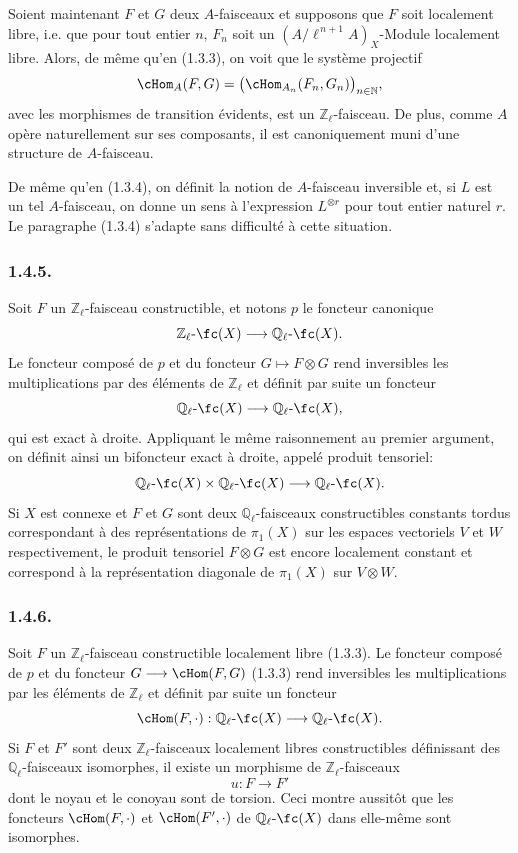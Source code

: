 Soient maintenant \(F\) et \(G\) deux \(A\)-faisceaux et supposons que \(F\) soit localement libre, i.e. que pour tout entier \(n\), \(F_n\) soit un \((A/\ell^{\,n+1}A)_X\)-Module localement libre. Alors, de même qu'en (1.3.3), on
voit que le système projectif
\[
\cHom_A(F,G)=\bigl(\cHom_{A_n}(F_n,G_n)\bigr)_{n\in\mathbb{N}},
\]
avec les morphismes de transition évidents, est un \(\mathbb{Z}_\ell\)-faisceau. De plus, comme \(A\) opère naturellement sur ses composants, il est canoniquement muni d'une structure de \(A\)-faisceau.

De même qu'en (1.3.4), on définit la notion de \(A\)-faisceau inversible et, si \(L\) est un tel \(A\)-faisceau, on donne un sens à l'expression \(L^{\otimes r}\) pour tout entier naturel \(r\). Le paragraphe (1.3.4) s'adapte sans difficulté à cette situation.

\subsubsection*{1.4.5.}
Soit \(F\) un \(\mathbb{Z}_\ell\)-faisceau constructible, et notons \(p\) le foncteur canonique
\[
\mathbb{Z}_\ell\text{-}\fc(X)\longrightarrow \mathbb{Q}_\ell\text{-}\fc(X).
\]
Le foncteur composé de \(p\) et du foncteur \(G\mapsto F\otimes G\) rend inversibles les multiplications par des éléments de \(\mathbb{Z}_\ell\) et définit par suite un foncteur
\[
\mathbb{Q}_\ell\text{-}\fc(X)\longrightarrow \mathbb{Q}_\ell\text{-}\fc(X),
\]
qui est exact à droite. Appliquant le même raisonnement au premier argument, on définit ainsi un bifoncteur exact à droite, appelé produit tensoriel:
\[
\mathbb{Q}_\ell\text{-}\fc(X)\times \mathbb{Q}_\ell\text{-}\fc(X)
\longrightarrow \mathbb{Q}_\ell\text{-}\fc(X).
\]
Si \(X\) est connexe et \(F\) et \(G\) sont deux \(\mathbb{Q}_\ell\)-faisceaux constructibles constants tordus correspondant à des représentations de \(\pi_1(X)\) sur les espaces vectoriels \(V\) et \(W\) respectivement, le produit tensoriel \(F\otimes G\) est encore localement constant et correspond à la représentation diagonale de \(\pi_1(X)\) sur \(V\otimes W\).

\subsubsection*{1.4.6.}
Soit \(F\) un \(\mathbb{Z}_\ell\)-faisceau constructible localement libre (1.3.3). Le foncteur composé de \(p\) et du foncteur \(G\longrightarrow\cHom(F,G)\) (1.3.3) rend inversibles les multiplications par les éléments de \(\mathbb{Z}_\ell\) et définit par suite un foncteur
\[
\cHom(F,\cdot):\mathbb{Q}_\ell\text{-}\fc(X)\longrightarrow \mathbb{Q}_\ell\text{-}\fc(X).
\]
Si \(F\) et \(F'\) sont deux \(\mathbb{Z}_\ell\)-faisceaux localement libres constructibles définissant des \(\mathbb{Q}_\ell\)-faisceaux isomorphes, il existe un morphisme de \(\mathbb{Z}_\ell\)-faisceaux
\[
u:F\longrightarrow F'
\]
dont le noyau et le conoyau sont de torsion. Ceci montre aussitôt que les foncteurs \(\cHom(F,\cdot)\) et \(\cHom(F',\cdot)\) de \(\mathbb{Q}_\ell\text{-}\fc(X)\) dans elle-même sont isomorphes.

